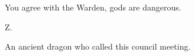\documentclass[char]{guardians}
\begin{document}
You agree with the Warden, gods are dangerous.

\begin{itemz}[Goals]
  \item Z.
\end{itemz}


\begin{contacts}
  \contact{\cCaretaker{}} An ancient dragon who called this council meeting.
\end{contacts}
\end{document}
